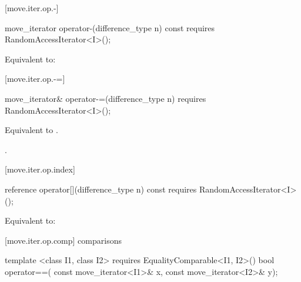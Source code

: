 [move.iter.op.-]{}

%
%
\begin{itemdecl}
move_iterator operator-(difference_type n) const
  requires RandomAccessIterator<I>();
\end{itemdecl}

\begin{itemdescr}
\pnum
\effects Equivalent to:
\end{itemdescr}

[move.iter.op.-=]{}

%
%
\begin{itemdecl}
move_iterator& operator-=(difference_type n)
  requires RandomAccessIterator<I>();
\end{itemdecl}

\begin{itemdescr}
\pnum
\effects Equivalent to .

\pnum
\returns {}.
\end{itemdescr}

[move.iter.op.index]{}

%
%
\begin{itemdecl}
reference operator[](difference_type n) const
  requires RandomAccessIterator<I>();
\end{itemdecl}

\begin{itemdescr}
\pnum
\effects Equivalent to:
\end{itemdescr}

[move.iter.op.comp]{ comparisons}

%
%
\begin{itemdecl}
template <class I1, class I2>
    requires EqualityComparable<I1, I2>()
  bool operator==(
    const move_iterator<I1>& x, const move_iterator<I2>& y);
\end{itemdecl}

